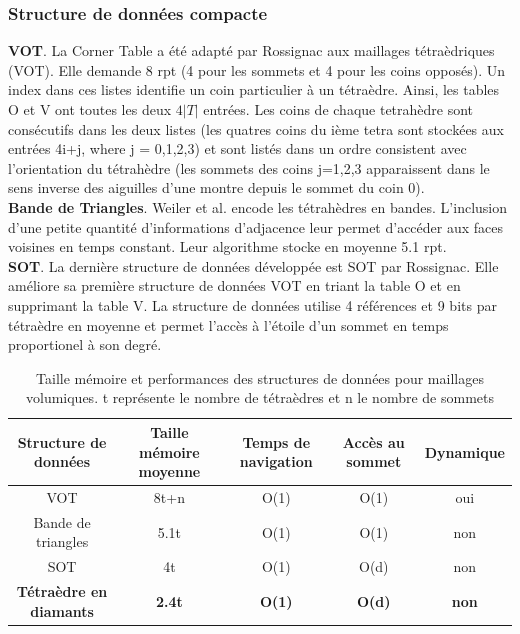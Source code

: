 \subsubsection{Structure de données compacte}
\noindent
\textbf{VOT}. La Corner Table a été adapté par Rossignac aux maillages tétraèdriques (VOT). Elle demande 8 rpt (4 pour les sommets et 4 pour les coins opposés). Un index dans ces listes identifie un coin particulier à un tétraèdre. Ainsi, les tables O et V ont toutes les deux $4|T|$ entrées. Les coins de chaque tetrahèdre sont consécutifs dans les deux listes (les quatres coins du ième tetra sont stockées aux entrées  4i+j, where j = 0,1,2,3) et sont listés dans un ordre consistent avec l'orientation du tétrahèdre (les sommets des coins j=1,2,3 apparaissent dans le sens inverse des aiguilles d'une montre depuis le sommet du coin 0).\\
\textbf{Bande de Triangles}. Weiler et al. \cite{triangle_strips_weiler} encode les tétrahèdres en bandes. L'inclusion d'une petite quantité d'informations d'adjacence leur permet d'accéder aux faces voisines en temps constant. Leur algorithme stocke en moyenne 5.1 rpt.\\
\textbf{SOT}. La dernière structure de données développée est SOT \cite{SOT} par Rossignac. Elle améliore sa première structure de données VOT en triant la table O et en supprimant la table V. La structure de données utilise 4 références et 9 bits par tétraèdre en moyenne et permet l'accès à l'étoile d'un sommet en temps proportionel à son degré.

\begin{table}[th]
\footnotesize
\begin{tabular}{|c | c | c | c | c|}
\hline
Structure de données & Taille mémoire moyenne & Temps de navigation & Accès au sommet & Dynamique\\
\hline
VOT & 8t+n & O(1) & O(1) & oui \\
Bande de triangles \cite{triangle_strips_weiler} & 5.1t & O(1) & O(1) & non \\
SOT \cite{SOT} & 4t & O(1) & O(d)  & non\\
\textbf{Tétraèdre en diamants} & \textbf{ 2.4t } & \textbf{O(1)} & \textbf{O(d)} & \textbf{non} \\
\hline  
\end{tabular}
\caption{Taille mémoire et performances des structures de données pour maillages volumiques. t représente le nombre de tétraèdres et n le nombre de sommets}
\end{table}